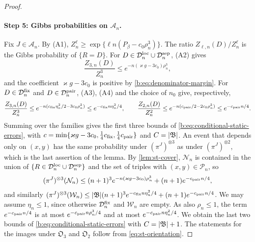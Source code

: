\begin{proof}
\paragraph{Step 5: Gibbs probabilities on $\mathcal A_n$.} Fix $J\in\mathcal A_n$. By (A1), $Z_n^\ell\ge\exp\{\ell n(P_\beta-c_0\rho_n^3)\}$. The ratio $Z_{\ell,n}(D)/Z_n^\ell$ is the Gibbs probability of $\{R=D\}$. For $D\in\mathcal D^{\rm loc}_n\cup\mathcal D^{\rm sep}_n$, (A2) gives
\[
 \frac{Z_{3,n}(D)}{Z_n^3}\le e^{-n(\varkappa g-3c_0)\rho_n^3},
\]
and the coefficient $\varkappa g-3c_0$ is positive by \eqref{b:eq:denominator-margin}. For $D\in\mathcal D^{\rm fix}_n$ and $D\in\mathcal D^{\rm pair}_n$, (A3), (A4) and the choice of $n_0$ give, respectively,
\[
 \frac{Z_{3,n}(D)}{Z_n^3}\le e^{-n(c_{\rm fix}\eta_n^2/2-3c_0\rho_n^3)}\le e^{-c_{\rm fix}n\eta_n^2/4},\qquad
 \frac{Z_{2,n}(D)}{Z_n^2}\le e^{-n(c_{\rm pair}/2-2c_0\rho_n^3)}\le e^{-c_{\rm pair}n/4}.
\]
Summing over the families gives the first three bounds of \eqref{b:eq:conditional-static-errors}, with $c=\min\{\varkappa g-3c_0,\frac14c_{\rm fix},\frac14c_{\rm pair}\}$ and $C=\lvert \mathfrak B\rvert$. An event that depends only on $(x,y)$ has the same probability under $(\pi^J)^{\otimes3}$ as under $(\pi^J)^{\otimes2}$, which is the last assertion of the lemma. By \cref{lem:st-cover}, $\mathcal N_n$ is contained in the union of $\{R\in\mathcal D^{\rm loc}_n\cup\mathcal D^{\rm sep}_n\}$ and the set of triples with $(x,y)\in\mathcal P_n$, so
\[
 (\pi^J)^{\otimes3}(\mathcal N_n)\le(n+1)^3e^{-n(\varkappa g-3c_0)\rho_n^3}+(n+1)e^{-c_{\rm pair}n/4},
\]
and similarly $(\pi^J)^{\otimes3}(\mathcal W_n)\le\lvert \mathfrak B\rvert(n+1)^3e^{-c_{\rm fix}n\eta_n^2/4}+(n+1)e^{-c_{\rm pair}n/4}$. We may assume $\eta_n\le1$, since otherwise $\mathcal D^{\rm fix}_n$ and $\mathcal W_n$ are empty. As also $\rho_n\le1$, the term $e^{-c_{\rm pair}n/4}$ is at most $e^{-c_{\rm pair}n\rho_n^3/4}$ and at most $e^{-c_{\rm pair}n\eta_n^2/4}$. We obtain the last two bounds of \eqref{b:eq:conditional-static-errors} with $C=\lvert \mathfrak B\rvert+1$. The statements for the images under $\mathfrak O_3$ and $\mathfrak O_2$ follow from \eqref{eq:st-orientation}.
\end{proof}

